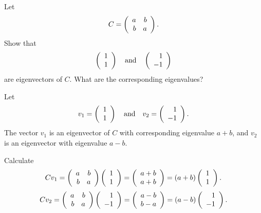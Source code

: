 \documentclass{ximera}
\begin{document}
\begin{exercise} \label{c4.5.3}
Let
\[
C=\mattwo{a}{b}{b}{a}.
\]
Show that
\[
\vectwo{1}{1} \AND \vectwo{1}{-1}
\]
are eigenvectors of $C$.  What are the corresponding eigenvalues?

\begin{solution}

\ans Let
\[ v_1 = \vectwo{1}{1} \AND v_2 = \vectwo{1}{-1}. \]
The vector $v_1$ is an eigenvector of $C$ with corresponding
eigenvalue $a + b$, and $v_2$ is an eigenvector with eigenvalue $a - b$.

\soln Calculate
\[ Cv_1 = \mattwo{a}{b}{b}{a}\vectwo{1}{1} = \vectwo{a + b}{a + b} =
(a + b)\vectwo{1}{1}. \]
\[ Cv_2 = \mattwo{a}{b}{b}{a}\vectwo{1}{-1} = \vectwo{a - b}{b - a} =
(a - b)\vectwo{1}{-1}. \]


\end{solution}
\end{exercise}
\end{document}
